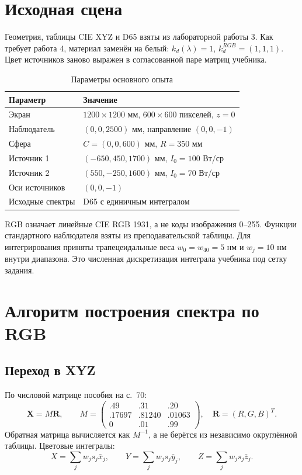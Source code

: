 \documentclass[a4paper,12pt]{article}
\begin{document}
\section{Исходная сцена}
Геометрия, таблицы CIE XYZ и D65 взяты из лабораторной работы 3. Как требует работа 4, материал заменён на белый: $k_d(\lambda)=1$, $k_d^{RGB}=(1,1,1)$. Цвет источников заново выражен в согласованной паре матриц учебника.
\begin{table}[H]\centering\small
\caption{Параметры основного опыта}
\begin{tabularx}{\textwidth}{@{}lX@{}}\toprule
Параметр & Значение\\\midrule
Экран & $1200\times1200$ мм, $600\times600$ пикселей, $z=0$\\
Наблюдатель & $(0,0,2500)$ мм, направление $(0,0,-1)$\\
Сфера & $C=(0,0,600)$ мм, $R=350$ мм\\
Источник 1 & $(-650,450,1700)$ мм, $I_0=100$ Вт/ср\\
Источник 2 & $(550,-250,1600)$ мм, $I_0=70$ Вт/ср\\
Оси источников & $(0,0,-1)$\\
Исходные спектры & D65 с единичным интегралом\\\bottomrule
\end{tabularx}\end{table}

RGB означает линейные CIE RGB 1931, а не коды изображения 0--255. Функции стандартного наблюдателя взяты из преподавательской таблицы. Для интегрирования приняты трапецеидальные веса $w_0=w_{40}=5$ нм и $w_j=10$ нм внутри диапазона. Это численная дискретизация интеграла учебника под сетку задания.

\clearpage
\section{Алгоритм построения спектра по RGB}
\subsection{Переход в XYZ}
По числовой матрице пособия на с.~70:
\[
 \boldsymbol X=M\boldsymbol R,\qquad
 M=\begin{pmatrix}
 .49&.31&.20\\ .17697&.81240&.01063\\ 0&.01&.99
 \end{pmatrix},\quad \boldsymbol R=(R,G,B)^T.
\]
Обратная матрица вычисляется как $M^{-1}$, а не берётся из независимо округлённой таблицы. Цветовые интегралы:
\[
 X=\sum_jw_js_j\bar x_j,\qquad Y=\sum_jw_js_j\bar y_j,\qquad
 Z=\sum_jw_js_j\bar z_j.
\]
\end{document}

